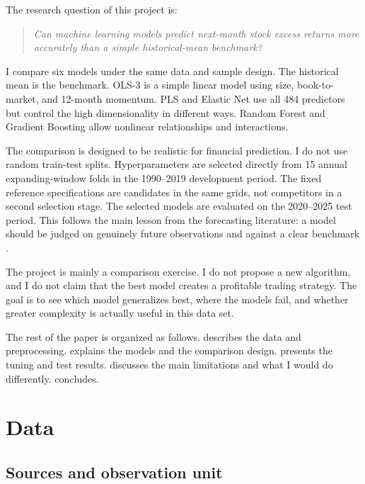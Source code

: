 \documentclass[11pt,a4paper]{article}
\begin{document}
The research question of this project is:

\begin{quote}
\emph{Can machine learning models predict next-month stock excess returns more
accurately than a simple historical-mean benchmark?}
\end{quote}

I compare six models under the same data and sample design. The historical mean
is the benchmark. OLS-3 is a simple linear model using size, book-to-market, and
12-month momentum. PLS and Elastic Net use all 484 predictors but control the
high dimensionality in different ways. Random Forest and Gradient Boosting
allow nonlinear relationships and interactions.

The comparison is designed to be realistic for financial prediction. I do not
use random train-test splits. Hyperparameters are selected directly from 15
annual expanding-window folds in the 1990--2019 development period. The fixed
reference specifications are candidates in the same grids, not competitors in
a second selection stage. The selected models are evaluated on the 2020--2025
test period. This follows the main lesson from the forecasting
literature: a model should be judged on genuinely future observations and
against a clear benchmark \parencite{welch2008comprehensive}.

The project is mainly a comparison exercise. I do not propose a new algorithm,
and I do not claim that the best model creates a profitable trading strategy.
The goal is to see which model generalizes best, where the models fail, and
whether greater complexity is actually useful in this data set.

The rest of the paper is organized as follows.  describes the
data and preprocessing.  explains the models and the
comparison design.  presents the tuning and test results.
 discusses the main limitations and what I would
do differently.  concludes.

\section{Data}
\label{sec:data}

\subsection{Sources and observation unit}
\end{document}
